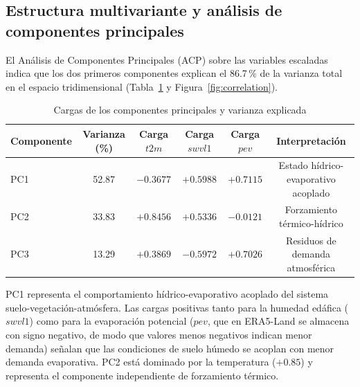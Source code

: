 \documentclass[12pt, a4paper]{article}
\begin{document}
\subsection{Estructura multivariante y análisis de componentes principales}
\label{subsec:pca}

El Análisis de Componentes Principales (ACP) sobre las variables escaladas indica que los dos primeros componentes explican el 86.7\,\% de la varianza total en el espacio tridimensional (Tabla~\ref{tab:pca} y Figura~\ref{fig:correlation}).

\begin{table}[H]
\centering
\caption{Cargas de los componentes principales y varianza explicada}
\label{tab:pca}
\small
\begin{tabular}{@{}lccccc@{}}
\toprule
Componente & Varianza (\%) & Carga $t2m$ & Carga $swvl1$ & Carga $pev$ & Interpretación \\
\midrule
PC1 & 52.87 & $-0.3677$ & $+0.5988$ & $+0.7115$ & Estado hídrico-evaporativo acoplado \\
PC2 & 33.83 & $+0.8456$ & $+0.5336$ & $-0.0121$ & Forzamiento térmico-hídrico \\
PC3 & 13.29 & $+0.3869$ & $-0.5972$ & $+0.7026$ & Residuos de demanda atmosférica \\
\bottomrule
\end{tabular}
\end{table}

PC1 representa el comportamiento hídrico-evaporativo acoplado del sistema suelo-vegetación-atmósfera. Las cargas positivas tanto para la humedad edáfica ($swvl1$) como para la evaporación potencial ($pev$, que en ERA5-Land se almacena con signo negativo, de modo que valores menos negativos indican menor demanda) señalan que las condiciones de suelo húmedo se acoplan con menor demanda evaporativa. PC2 está dominado por la temperatura ($+0.85$) y representa el componente independiente de forzamiento térmico.
\end{document}
